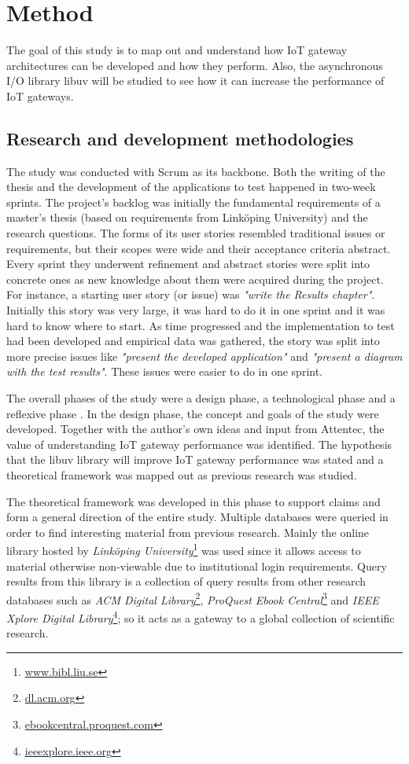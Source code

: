 \chapter{Method}
\label{cha:method}

The goal of this study is to map out and understand how IoT gateway
architectures can be developed and how they perform. Also, the asynchronous I/O
library libuv will be studied to see how it can increase the performance of IoT
gateways.

\section{Research and development methodologies}

The study was conducted with Scrum as its backbone. Both the writing of the
thesis and the development of the applications to test happened in two-week
sprints. The project's backlog was initially the fundamental requirements of a
master's thesis (based on requirements from Linköping University) and the
research questions. The forms of its user stories resembled traditional issues
or requirements, but their scopes were wide and their acceptance criteria
abstract. Every sprint they underwent refinement and abstract stories were
split into concrete ones as new knowledge about them were acquired during the
project. For instance, a starting user story (or issue) was \textit{"write the
Results chapter"}. Initially this story was very large, it was hard to do it in
one sprint and it was hard to know where to start. As time progressed and the
implementation to test had been developed and empirical data was gathered, the
story was split into more precise issues like \textit{"present the developed
application"} and \textit{"present a diagram with the test results"}. These
issues were easier to do in one sprint.

The overall phases of the study were a design phase, a technological phase
and a reflexive phase \cite{novikov2013research}. In the design phase, the
concept and goals of the study were developed. Together with the author's own
ideas and input from Attentec, the value of understanding IoT gateway
performance was identified. The hypothesis that the libuv library will improve
IoT gateway performance was stated and a theoretical framework was mapped out
as previous research was studied.

The theoretical framework was developed in this phase to support claims and
form a general direction of the entire study. Multiple databases were queried
in order to find interesting material from previous research. Mainly the online
library hosted by \textit{Linköping University}\footnote{\url{www.bibl.liu.se}}
was used since it allows access to material otherwise non-viewable due to
institutional login requirements. Query results from this library is a
collection of query results from other research databases such as \textit{ACM
Digital Library}\footnote{\url{dl.acm.org}}, \textit{ProQuest Ebook
Central}\footnote{\url{ebookcentral.proquest.com}} and \textit{IEEE Xplore
Digital Library}\footnote{\url{ieeexplore.ieee.org}}; so it acts as a gateway
to a global collection of scientific research.

